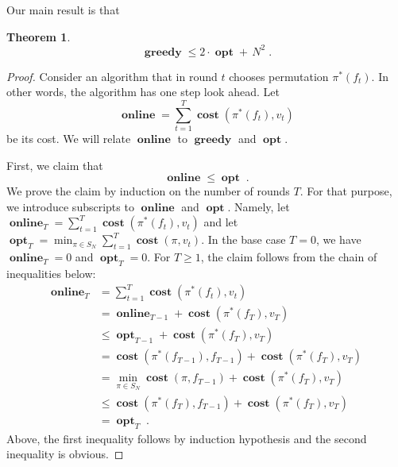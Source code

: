 \documentclass[12pt]{article}
\newtheorem{theorem}[lemma]{Theorem}
\DeclareMathOperator{\cost}{\mathbf{cost}}
\DeclareMathOperator{\greedy}{\mathbf{greedy}}
\DeclareMathOperator{\online}{\mathbf{online}}
\DeclareMathOperator{\opt}{\mathbf{opt}}
\begin{document}
Our main result is that

\begin{theorem}
$$
\greedy \le 2 \cdot \opt + \, N^2 \; .
$$
\end{theorem}

\begin{proof}
Consider an algorithm that in round $t$ chooses permutation $\pi^*(f_t)$.
In other words, the algorithm has one step look ahead. Let
$$
\online = \sum_{t=1}^T \cost(\pi^*(f_t), v_t)
$$
be its cost. We will relate $\online$ to $\greedy$ and $\opt$.

First, we claim that
\begin{equation}
\label{equation:claim}
\online \le \opt \; .
\end{equation}
We prove the claim by induction on the number of rounds $T$. For that purpose,
we introduce subscripts to $\online$ and $\opt$. Namely, let $\online_T =
\sum_{t=1}^T \cost(\pi^*(f_t), v_t)$ and let $\opt_T = \min_{\pi \in S_N}
\sum_{t=1}^T \cost(\pi, v_t)$. In the base case $T=0$, we have $\online_T = 0$
and $\opt_T = 0$. For $T \ge 1$, the claim follows from the chain of
inequalities below:
\begin{align*}
\online_T
& = \sum_{t=1}^T \cost(\pi^*(f_t), v_t) \\
& = \online_{T-1} + \cost(\pi^*(f_T), v_T) \\
& \le \opt_{T-1} + \cost(\pi^*(f_T), v_T) \\
& = \cost(\pi^*(f_{T-1}), f_{T-1}) + \cost(\pi^*(f_T), v_T) \\
& = \min_{\pi \in S_N} \cost(\pi, f_{T-1}) + \cost(\pi^*(f_T), v_T) \\
& \le \cost(\pi^*(f_T), f_{T-1}) + \cost(\pi^*(f_T), v_T) \\
& = \opt_T \; .
\end{align*}
Above, the first inequality follows by induction hypothesis and
the second inequality is obvious.


\end{proof}
\end{document}
